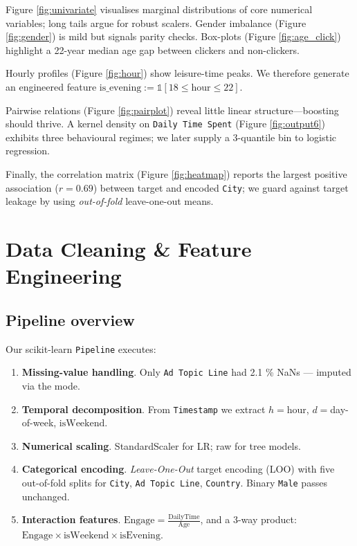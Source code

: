 \documentclass[12pt,a4paper]{article}
\begin{document}
\vspace{-0.5em}
Figure \ref{fig:univariate} visualises marginal distributions of core
numerical variables; long tails argue for robust scalers.  
Gender imbalance (Figure \ref{fig:gender}) is mild but signals parity
checks.  
Box-plots (Figure \ref{fig:age_click}) highlight a 22-year median age
gap between clickers and non-clickers.

Hourly profiles (Figure \ref{fig:hour}) show leisure-time peaks.  
We therefore generate an engineered feature
\(\text{is\_evening} := \mathbb{1}[18 \le \text{hour} \le 22]\).

Pairwise relations (Figure \ref{fig:pairplot}) reveal little linear
structure—boosting should thrive.  
A kernel density on \texttt{Daily Time Spent} (Figure \ref{fig:output6})
exhibits three behavioural regimes; we later supply a
3-quantile bin to logistic regression.

Finally, the correlation matrix (Figure \ref{fig:heatmap}) reports the
largest positive association (\(r=0.69\)) between target and encoded
\texttt{City}; we guard against target leakage by using
\emph{out-of-fold} leave-one-out means.

\section{Data Cleaning \& Feature Engineering} \label{sec:fe}

\subsection{Pipeline overview}
Our scikit-learn \texttt{Pipeline} executes:

\begin{enumerate}[leftmargin=2em]
  \item \textbf{Missing-value handling}.  Only \texttt{Ad Topic Line}
        had 2.1 \% NaNs — imputed via the mode.
  \item \textbf{Temporal decomposition}.  From
        \texttt{Timestamp} we extract
        \(h=\)hour, \(d=\)day-of-week, \(\text{isWeekend}\).
  \item \textbf{Numerical scaling}.  
        StandardScaler for LR; raw for tree models.
  \item \textbf{Categorical encoding}.  
        \emph{Leave-One-Out} target encoding (LOO) with five
        out-of-fold splits for \texttt{City}, \texttt{Ad Topic Line},
        \texttt{Country}.  
        Binary \texttt{Male} passes unchanged.
  \item \textbf{Interaction features}.
        \(\text{Engage}=\frac{\text{DailyTime}}{\text{Age}}\),
        and a 3-way product:
        \(\text{Engage} \times \text{isWeekend} \times \text{isEvening}\).
\end{enumerate}
\end{document}
